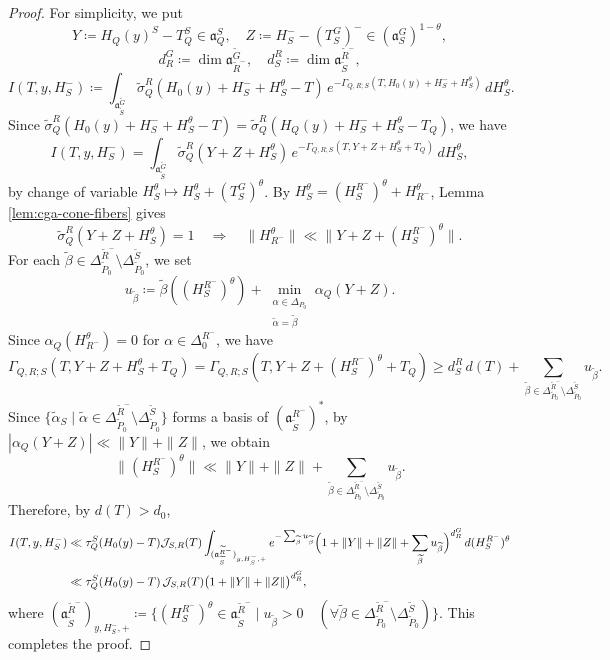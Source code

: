 \documentclass[12pt]{amsart}
\theoremstyle{definition}
\theoremstyle{plain}
\theoremstyle{remark}
\newcommand{\fa}{\mathfrak{a}}
\newcommand{\cJ}{\mathcal{J}}
\numberwithin{equation}{section}
\newcommand{\tG}{\widetilde{G}}
\newcommand{\tP}{\widetilde{P}}
\newcommand{\tR}{\widetilde{R}}
\newcommand{\tS}{\widetilde{S}}
\newcommand{\talpha}{\widetilde{\alpha}}
\newcommand{\tbeta}{\widetilde{\beta}}
\newcommand{\tsigma}{\widetilde{\sigma}}
\begin{document}
\begin{proof}
For simplicity, we put
\[
Y\coloneqq H_Q(y)^S-T_Q^S\in \fa_Q^S,
\quad
Z\coloneqq H_S^--(T_S^{G})^-\in(\fa_S^G)^{1-\theta},
\]
\[
d_R^G\coloneqq \dim\fa_{\tR^-}^{\tG},
\quad
d_S^R\coloneqq \dim\fa_{\tS}^{\tR^-},
\]
\[
I(T,y,H_S^-)
\coloneqq 
\int_{\fa_{\tS}^{\tG}}
\tsigma_Q^R(H_0(y)+H_S^-+H_S^\theta-T)\,
e^{-\Gamma_{Q,R;S}(T,H_0(y)+H_S^-+H_S^\theta)}\,dH_S^\theta.
\]
Since $\tsigma_Q^R(H_0(y)+H_S^-+H_S^\theta-T)=\tsigma_Q^R(H_Q(y)+H_S^-+H_S^\theta-T_Q)$, we have
\[
I(T,y,H_S^-)=\int_{\fa_{\tS}^{\tG}}
\tsigma_Q^R(Y+Z+H_S^\theta)\,
e^{-\Gamma_{Q,R;S}(T,Y+Z+H_S^\theta+T_Q)}\,dH_S^\theta,
\]
by change of variable $H_S^\theta\mapsto H_S^\theta+(T_S^G)^\theta$.
By $H_S^\theta=(H_S^{R^-})^\theta+H_{R^-}^\theta$,
Lemma \ref{lem:cga-cone-fibers} gives
\[
\widetilde\sigma_Q^R(Y+Z+H_S^\theta)=1
\quad\Longrightarrow\quad
\|H_{R^-}^\theta \|\ll\|Y+Z+(H_S^{R^-})^\theta\|.
\]
For each $\tbeta\in\Delta_{\tP_0}^{\tR^-}\setminus\Delta_{\tP_0}^{\tS}$, we set
\[
u_{\tbeta}\coloneqq \widetilde\beta((H_S^{R^-})^\theta)+\min_{\substack{\alpha\in\Delta_{P_0}\\
                 \widetilde\alpha=\widetilde\beta}} \alpha_Q(Y+Z).
\]
Since $\alpha_Q(H_{R^-}^\theta)=0$ for $\alpha\in \Delta_0^{R^-}$, we have 
\[
\Gamma_{Q,R;S}(T,Y+Z+H_S^\theta+T_Q)= \Gamma_{Q,R;S}(T,Y+Z+(H_S^{R^-})^\theta+T_Q)
 \ge  d_S^R \, d(T)+\sum_{\tbeta\in\Delta_{\tP_0}^{\tR^-}\setminus\Delta_{\tP_0}^{\tS}}u_{\tbeta} .  
\]
Since $\{ \talpha_{S} \mid \talpha\in \Delta_{\tP_0}^{\tR^-}\setminus\Delta_{\tP_0}^{\tS}\}$ forms a basis of $(\fa_{\tS}^{R^-})^*$, by $|\alpha_Q(Y+Z)|\ll \|Y\|+\|Z\|$, we obtain
\[
\|(H_S^{R^-})^\theta\| \ll \|Y\|+\|Z\|
+\sum_{\tbeta\in\Delta_{\tP_0}^{\tR^-}\setminus\Delta_{\tP_0}^{\tS}}u_{\tbeta}.
\]
Therefore, by $d(T)>d_0$,
\begin{align*}
I(T,y,H_S^-)
&\ll
\tau_Q^S(H_0(y)-T) \cJ_{S,R}(T)
\int_{(\fa_{\tS}^{\tR^-})_{y,H_S^-,+}}
e^{-\sum_{\widetilde\beta}u_{\widetilde\beta}}
\Bigl(
1+\|Y\|+\|Z\|
+\sum_{\widetilde\beta}u_{\widetilde\beta}
\Bigr)^{d_R^G} \, d(H_S^{R^-})^\theta \\ %
&\ll
\tau_Q^S(H_0(y)-T)\,\cJ_{S,R}(T)
\bigl(1+\|Y\|+\|Z\|\bigr)^{d_R^G},    
\end{align*}
where $(\fa_{\tS}^{\tR^-})_{y,H_S^-,+}\coloneqq \{ (H_S^{R^-})^\theta\in \fa_{\tS}^{\tR^-} \mid  u_{\tbeta}>0 \quad (\forall \tbeta\in \Delta_{\tP_0}^{\tR^-}\setminus\Delta_{\tP_0}^{\tS} ) \}$.
This completes the proof.
\end{proof}
\end{document}
